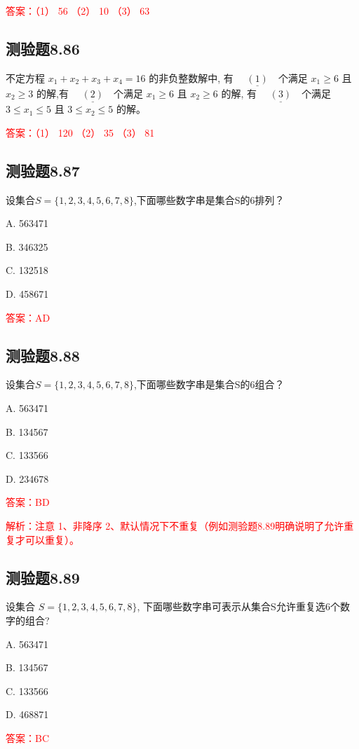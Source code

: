 \documentclass[UTF8, heading=true]{ctexart}
\begin{document}
\textcolor{red}{答案：（1） 56 （2） 10 （3） 63}


\subsection{测验题8.86}

不定方程 $x_1+x_2+x_3+x_4=16$ 的非负整数解中, 有 $\underline{\quad(1)\quad}$个满足 $x_1 \geq 6$ 且 $x_2 \geq 3$ 的解,有
$\underline{\quad(2)\quad}$个满足 $x_1 \geq 6$ 且 $x_2 \geq 6$ 的解, 有 $\underline{\quad(3)\quad}$个满足 $3 \leq x_1 \leq 5$ 且 $3 \leq x_2 \leq 5$ 的解。

\textcolor{red}{答案：（1） 120 （2） 35 （3） 81}

\subsection{测验题8.87}
设集合$S=\{1,2,3,4,5,6,7,8\}$,下面哪些数字串是集合S的6排列？

A. 563471

B. 346325

C. 132518

D. 458671

\textcolor{red}{答案：AD}

\subsection{测验题8.88}

设集合$S=\{1,2,3,4,5,6,7,8\}$,下面哪些数字串是集合S的6组合？

A. 563471

B. 134567

C. 133566

D. 234678

\textcolor{red}{答案：BD}

\textcolor{red}{解析：注意 1、非降序 2、默认情况下不重复（例如测验题8.89明确说明了允许重复才可以重复）。}

\subsection{测验题8.89}

设集合 $S=\{1,2,3,4,5,6,7,8\}$, 下面哪些数字串可表示从集合S允许重复选6个数字的组合?

A. 563471

B. 134567

C. 133566

D. 468871

\textcolor{red}{答案：BC}
\end{document}
